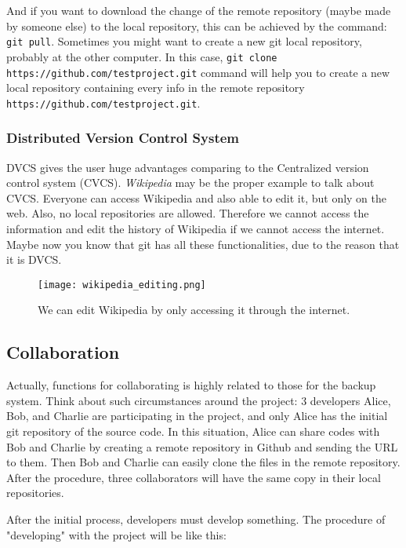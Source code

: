 \documentclass{oblivoir}
\begin{document}
And if you want to download the change of the remote repository (maybe made by someone else) to the local repository, this can be achieved by the command: \texttt{git pull}. Sometimes you might want to create a new git local repository, probably at the other computer. In this case, \texttt{git clone} \texttt{https://github.com/testproject.git} command will help you to create a new local repository containing every info in the remote repository \texttt{https://github.com/testproject.git}. 

\subsubsection{Distributed Version Control System}

DVCS gives the user huge advantages comparing to the Centralized version control system (CVCS). \textit{Wikipedia} may be the proper example to talk about CVCS. Everyone can access Wikipedia and also able to edit it, but only on the web. Also, no local repositories are allowed. Therefore we cannot access the information and edit the history of Wikipedia if we cannot access the internet. Maybe now you know that git has all these functionalities, due to the reason that it is DVCS. 

\begin{figure}[h]
    \centering
    \texttt{[image: wikipedia\_editing.png]}
    \caption{We can edit Wikipedia by only accessing it through the internet.}
    \label{fig:my_label}
\end{figure}


\subsection{Collaboration}


Actually, functions for collaborating is highly related to those for the backup system. Think about such circumstances around the project: 3 developers Alice, Bob, and Charlie are participating in the project, and only Alice has the initial git repository of the source code. In this situation, Alice can share codes with Bob and Charlie by creating a remote repository in Github and sending the URL to them. Then Bob and Charlie can easily clone the files in the remote repository. After the procedure, three collaborators will have the same copy in their local repositories. 

After the initial process, developers must develop something. The procedure of "developing" with the project will be like this:
\end{document}
